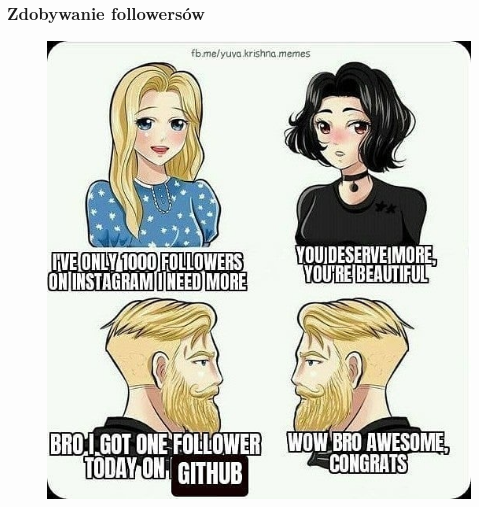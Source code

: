 \documentclass[10pt,t]{beamer}
\begin{document}
\begin{frame}
  \frametitle{Zdobywanie followersów}


  \begin{figure}

    \centering


    \includegraphics[scale=0.35]
    {./PresentationsPictures/Getting-followers.jpg}

  \end{figure}

\end{frame}
\end{document}
